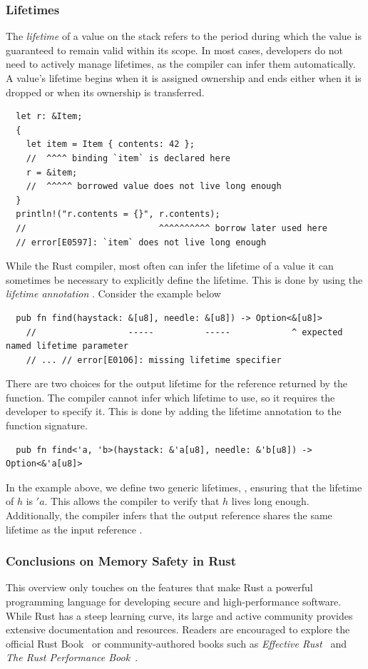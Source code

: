 \documentclass[11pt]{report}
\theoremstyle{definition}
\theoremstyle{plain}
\begin{document}
\subsubsection{Lifetimes}
The \textit{lifetime} of a value on the stack refers to the period during which the value is guaranteed to remain valid within its scope. In most cases, developers do not need to actively manage lifetimes, as the compiler can infer them automatically. A value's lifetime begins when it is assigned ownership and ends either when it is dropped or when its ownership is transferred.
\begin{verbatim}
  let r: &Item;
  {
    let item = Item { contents: 42 };
    //  ^^^^ binding `item` is declared here
    r = &item;
    //  ^^^^^ borrowed value does not live long enough
  }
  println!("r.contents = {}", r.contents);
  //                          ^^^^^^^^^^ borrow later used here
  // error[E0597]: `item` does not live long enough
\end{verbatim}
While the Rust compiler, most often can infer the lifetime of a value it can sometimes be necessary to explicitly define the lifetime. This is done by using the \textit{lifetime annotation} . Consider the example below
\begin{verbatim}
  pub fn find(haystack: &[u8], needle: &[u8]) -> Option<&[u8]> 
    //                  -----          -----            ^ expected named lifetime parameter
    // ... // error[E0106]: missing lifetime specifier
\end{verbatim}
There are two choices for the output lifetime for the reference returned by the function. The compiler cannot infer which lifetime to use, so it requires the developer to specify it. This is done by adding the lifetime annotation to the function signature.
\begin{verbatim}
  pub fn find<'a, 'b>(haystack: &'a[u8], needle: &'b[u8]) -> Option<&'a[u8]>
\end{verbatim}
In the example above, we define two generic lifetimes, , ensuring that the lifetime of $h$ is $'a$. This allows the compiler to verify that $h$ lives long enough. Additionally, the compiler infers that the output reference shares the same lifetime as the input reference .

\subsubsection{Conclusions on Memory Safety in Rust}
This overview only touches on the features that make Rust a powerful programming language for developing secure and high-performance software. While Rust has a steep learning curve, its large and active community provides extensive documentation and resources. Readers are encouraged to explore the official Rust Book~\cite{rustlangRustProgramming} or community-authored books such as \textit{Effective Rust}~\cite{lurklurkEffectiveRust} and \textit{The Rust Performance Book}~\cite{rustlangPerformanceBook}.
\end{document}

